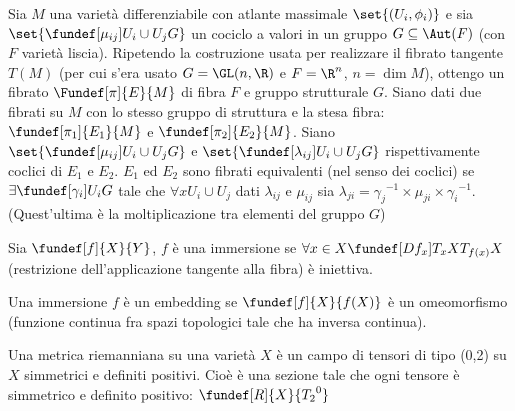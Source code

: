 
\newcommand*\tc{\ \text{t.c.} \ } %
\newcommand*\dual{{^\ast}} %
\newcommand*\base[1][B]{\mathcal{#1}} %

\begin{defn}
Sia $M$ una varietà differenziabile con atlante massimale $\set{(U_i, \phi_i)}$ e sia $\set{ \fundef[\mu_{ij}]{U_i \cup U_j}{G} }$ un cociclo a valori in un gruppo $G \subseteq \Aut(F)$ (con $F$ varietà liscia). Ripetendo la costruzione usata per realizzare il fibrato tangente $T(M)$ (per cui s'era usato $G = \GL(n, \R)$ e $F=\R^n$, $n = \dim M$), ottengo un fibrato $\Fundef[\pi]{E}{M}$ di fibra $F$ e gruppo strutturale $G$.
Siano dati due fibrati su $M$ con lo stesso gruppo di struttura e la stesa fibra: $\fundef[\pi_1]{E_1}{M}$ e  $\fundef[\pi_2]{E_2}{M}$.
Siano $\set{ \fundef[\mu_{ij}]{U_i \cup U_j}{G} }$ e $\set{ \fundef[\lambda_{ij}]{U_i \cup U_j}{G} }$ rispettivamente coclici di $E_1$ e $E_2$.
$E_1$ ed $E_2$ sono fibrati equivalenti (nel senso dei coclici) se $\exists \fundef[\gamma_{i}]{U_i}{G}$ tale che $\forall x U_i \cup U_j$ dati $\lambda_{ij}$ e $\mu_{ij}$
sia $\lambda_{ji} = {\gamma_j}^{-1} \times \mu_{ji} \times  {\gamma_i}^{-1}$.  (Quest'ultima è la moltiplicazione tra elementi del gruppo $G$)
\end{defn}
\begin{defn}
Sia $\fundef[f]{X}{Y}$, $f$ è una immersione se $\forall x \in X \fundef[Df_{x}]{T_{x}X}{T_{f(x)} X}$ (restrizione dell'applicazione tangente alla fibra) è iniettiva.
\end{defn}

\begin{defn}[Embedding] 
 Una immersione $f$ è un embedding se $\fundef[f]{X}{f(X)}$  è un omeomorfismo (funzione continua fra spazi topologici tale che ha inversa continua).
\end{defn}


\begin{defn} %
 Una metrica riemanniana su una varietà $X$ è un campo di tensori di tipo (0,2) su $X$ simmetrici e definiti positivi. Cioè è una sezione tale che ogni tensore è simmetrico 
 e definito positivo: $\fundef[R]{X}{{T_{2}}^{0}}$ 
\end{defn}

